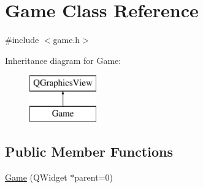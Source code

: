 \hypertarget{class_game}{}\section{Game Class Reference}
\label{class_game}


{\ttfamily \#include $<$game.\+h$>$}

Inheritance diagram for Game\+:\begin{figure}[H]
\begin{center}
\leavevmode
\includegraphics[height=2.000000cm]{class_game}
\end{center}
\end{figure}
\subsection*{Public Member Functions}
\begin{DoxyCompactItemize}
\item 
\hyperlink{class_game_ae3c64a8dd73de0a99849db8ec0e9a86c}{Game} (Q\+Widget $\ast$parent=0)
\end{DoxyCompactItemize}
